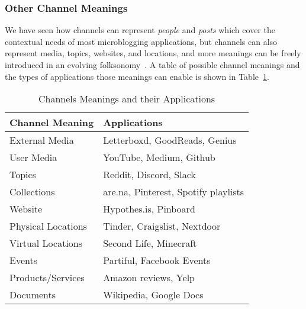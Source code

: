 
\subsubsection{Other Channel Meanings}

We have seen how channels can represent \emph{people} and \emph{posts}
which cover the contextual needs of most microblogging applications,
but channels can also represent media, topics, websites, and locations,
and more meanings can be freely introduced in an evolving folksonomy~\cite{folksonomy}.
A table of possible channel meanings and the types of applications
those meanings can enable is shown in Table~\ref{concepts:channels-and-applications}.


\begin{table}[h]
\small
\caption{Channels Meanings and their Applications}
\label{concepts:channels-and-applications}
\centering
\begin{tabular}{|l|l|}
\hline
\textbf{Channel Meaning} & \textbf{Applications} \\ \hline
External Media & Letterboxd, GoodReads, Genius \\ \hline
User Media & YouTube, Medium, Github \\ \hline
Topics & Reddit, Discord, Slack \\ \hline
Collections & are.na, Pinterest, Spotify playlists \\ \hline
Website & Hypothes.is, Pinboard \\ \hline
Physical Locations & Tinder, Craigslist, Nextdoor \\ \hline
Virtual Locations & Second Life, Minecraft \\ \hline
Events & Partiful, Facebook Events \\ \hline
Products/Services & Amazon reviews, Yelp \\ \hline
Documents & Wikipedia, Google Docs \\ \hline
\end{tabular}
\end{table}


